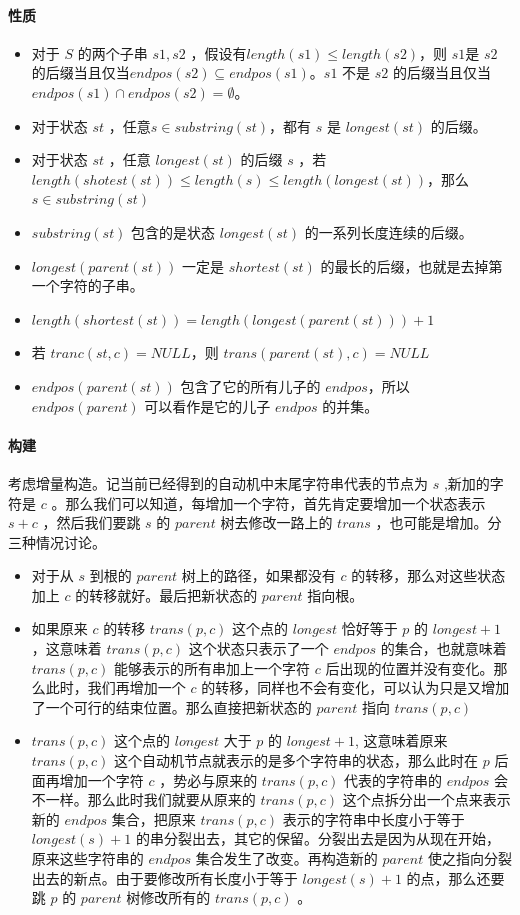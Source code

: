 \documentclass[UTF-8]{ctexart}
\newcommand{\cpp}[1]{\inputminted[bgcolor=bg,breaklines,breakanywhere=true]{c++}{#1}}
\begin{document}
			\paragraph{性质}
			\begin{itemize}
				\item 对于 $S$ 的两个子串 $s1,s2$ ，假设有$length(s1) \le length(s2)$，则 $s1$是 $s2$ 的后缀当且仅当$endpos(s2) \subseteq endpos(s1)$。$s1$ 不是 $s2$ 的后缀当且仅当$endpos(s1) \cap endpos(s2)= \emptyset$。
				\item 对于状态 $st$ ，任意$s \in substring(st)$，都有 $s$ 是 $longest(st)$ 的后缀。
				\item 对于状态 $st$ ，任意 $longest(st)$ 的后缀 $s$ ，若$length(shotest(st)) \le length(s) \le length(longest(st))$，那么$s \in substring(st)$
				\item  $substring(st)$ 包含的是状态 $longest(st)$ 的一系列长度连续的后缀。
				\item  $longest(parent(st))$ 一定是 $shortest(st)$ 的最长的后缀，也就是去掉第一个字符的子串。
				\item  $length(shortest(st))=length(longest(parent(st)))+1$
				\item 若 $tranc(st,c)=NULL$，则 $trans(parent(st),c)=NULL$
				\item  $endpos(parent(st))$ 包含了它的所有儿子的 $endpos$，所以 $endpos(parent)$ 可以看作是它的儿子 $endpos$ 的并集。
			\end{itemize}
			\paragraph{构建} 考虑增量构造。记当前已经得到的自动机中末尾字符串代表的节点为 $s$ ,新加的字符是 $c$ 。那么我们可以知道，每增加一个字符，首先肯定要增加一个状态表示 $s+c$ ，然后我们要跳 $s$ 的 $parent$ 树去修改一路上的 $trans$ ，也可能是增加。分三种情况讨论。
			\begin{itemize}
				\item 对于从 $s$ 到根的 $parent$ 树上的路径，如果都没有 $c$ 的转移，那么对这些状态加上 $c$ 的转移就好。最后把新状态的 $parent$ 指向根。
				\item 如果原来 $c$ 的转移 $trans(p,c)$ 这个点的 $longest$ 恰好等于 $p$ 的 $longest+1$，这意味着 $trans(p,c)$ 这个状态只表示了一个 $endpos$ 的集合，也就意味着 $trans(p,c)$ 能够表示的所有串加上一个字符 $c$ 后出现的位置并没有变化。那么此时，我们再增加一个 $c$ 的转移，同样也不会有变化，可以认为只是又增加了一个可行的结束位置。那么直接把新状态的 $parent$ 指向 $trans(p,c)$
				\item $trans(p,c)$ 这个点的 $longest$ 大于 $p$ 的 $longest+1$, 这意味着原来 $trans(p,c)$ 这个自动机节点就表示的是多个字符串的状态，那么此时在 $p$ 后面再增加一个字符 $c$ ，势必与原来的 $trans(p,c)$ 代表的字符串的 $endpos$ 会不一样。那么此时我们就要从原来的 $trans(p,c)$ 这个点拆分出一个点来表示新的 $endpos$ 集合，把原来 $trans(p,c)$ 表示的字符串中长度小于等于 $longest(s)+1$ 的串分裂出去，其它的保留。分裂出去是因为从现在开始，原来这些字符串的 $endpos$ 集合发生了改变。再构造新的 $parent$ 使之指向分裂出去的新点。由于要修改所有长度小于等于 $longest(s)+1$ 的点，那么还要跳 $p$ 的 $parent$ 树修改所有的 $trans(p,c)$ 。
			\end{itemize}
			\cpp{code//String//sam.cpp}
\end{document}
